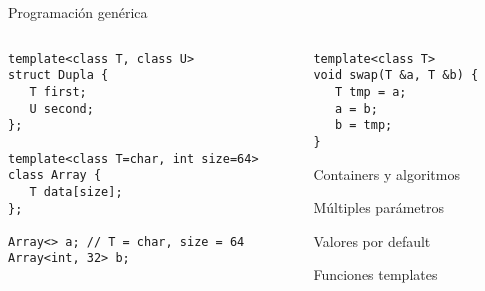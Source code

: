 \begin{frame}[fragile]{Programaci\'on gen\'erica}
   \begin{columns}
      \begin{column}{.58\linewidth}
         \begin{lstlisting}[style=normalnonumbers,linebackgroundcolor={%
         \only<1,4>{\def\lst@linebgrdcmd####1####2####3{}}%
         \btLstHLB<2>{1,3-4}% uso de T y U
         \btLstHLB<3>{7,9}% uso de int y default
   }]
template<class T, class U>
struct Dupla {
   T first;
   U second;
};

template<class T=char, int size=64>
class Array {
   T data[size];
};

Array<> a; // T = char, size = 64
Array<int, 32> b;

         \end{lstlisting}
      \end{column}
      \begin{column}{.4\linewidth}
         \begin{lstlisting}[style=normalnonumbers,linebackgroundcolor={%
         \only<1-3>{\def\lst@linebgrdcmd####1####2####3{}}%
         \btLstHLB<4>{1,2}% uso funciones templates
   }]
template<class T>
void swap(T &a, T &b) {
   T tmp = a;
   a = b;
   b = tmp;
}
         \end{lstlisting}
         \begin{itemize}
             {
            \item Containers y algoritmos
                }
             {
            \item M\'ultiples par\'ametros
                }
             {
                \item Valores por default
                }
             {
                \item Funciones templates
                }
         \end{itemize}
      \end{column}
   \end{columns}
\end{frame}


